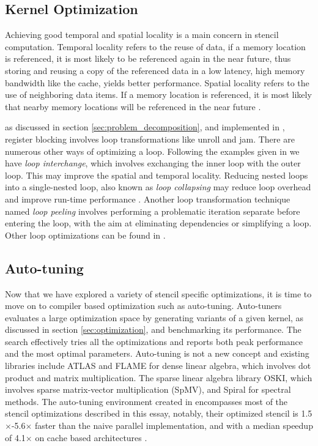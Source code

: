 \subsection{Kernel Optimization}
Achieving good temporal and spatial locality is a main concern in stencil computation. Temporal locality refers to the reuse of data, if a memory location is referenced, it is most likely to be referenced again in the near future, thus storing and reusing a copy of the referenced data in a low latency, high memory bandwidth like the cache, yields better performance. Spatial locality refers to the use of neighboring data items. If a memory location is referenced, it is most likely that nearby memory locations will be referenced in the near future \cite{article14}.

as discussed in section \ref{sec:problem_decomposition}, and implemented in \cite{article1}, register blocking involves loop transformations like unroll and jam. There are numerous other ways of optimizing a loop. Following the examples given in \cite{article10} we have \textit{loop interchange}, which involves exchanging the inner loop with the outer loop. This may improve the spatial and temporal locality. Reducing nested loops into a single-nested loop, also known as \textit{loop collapsing} may reduce loop overhead and improve run-time performance \cite{article11}. Another loop transformation technique named \textit{loop peeling} involves performing a problematic iteration separate before entering the loop, with the aim at eliminating dependencies or simplifying a loop. Other loop optimizations can be found in \cite{article12}.

\subsection{Auto-tuning}
Now that we have explored a variety of stencil specific optimizations, it is time to move on to compiler based optimization such as auto-tuning. Auto-tuners evaluates a large optimization space by generating variants of a given kernel, as discussed in section \ref{sec:optimization}, and benchmarking its performance. The search effectively tries all the optimizations and reports both peak performance and the most optimal parameters. Auto-tuning is not a new concept and existing libraries include ATLAS and FLAME for dense linear algebra, which involves dot product and matrix multiplication. The sparse linear algebra library OSKI, which involves sparse matrix-vector multiplication (SpMV), and Spiral for spectral methods. The auto-tuning environment created in \cite{article1} encompasses most of the stencil optimizations described in this essay, notably, their optimized stencil is 1.5\(\times\)-5.6\(\times\) faster than the naive parallel implementation, and with a median speedup of 4.1\(\times\)  on cache based architectures \cite{article1}.

